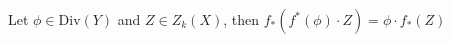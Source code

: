 

    Let $\phi\in \mathrm{Div}(Y)$ and $Z\in Z_k(X)$, then $f_*(f^*(\phi)\cdot Z)= \phi\cdot f_*(Z)$

